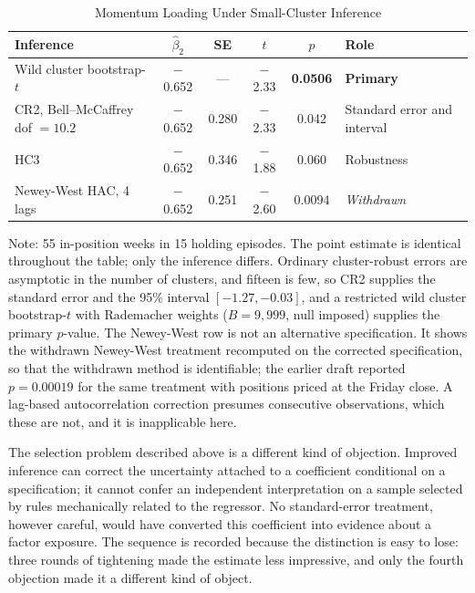 \documentclass[11pt]{article}
\begin{document}
\begin{table}[H]
\centering
\caption{Momentum Loading Under Small-Cluster Inference}
\label{tab:sevariants}
\small
\begin{tabular}{@{}lccccl@{}}
\toprule
Inference & $\hat{\beta}_2$ & SE & $t$ & $p$ & Role \\
\midrule
Wild cluster bootstrap-$t$ & $-$0.652 & --- & $-$2.33 & \textbf{0.0506} & \textbf{Primary} \\
CR2, Bell--McCaffrey dof $= 10.2$ & $-$0.652 & 0.280 & $-$2.33 & 0.042 & Standard error and interval \\
HC3 & $-$0.652 & 0.346 & $-$1.88 & 0.060 & Robustness \\
\midrule
Newey-West HAC, 4 lags & $-$0.652 & 0.251 & $-$2.60 & 0.0094 & \emph{Withdrawn} \\
\bottomrule
\end{tabular}
\par\vspace{0.3em}
\parbox{\linewidth}{\footnotesize Note: 55 in-position weeks in 15 holding episodes. The point estimate is identical throughout the table; only the inference differs. Ordinary cluster-robust errors are asymptotic in the number of clusters, and fifteen is few, so CR2 supplies the standard error and the 95\% interval $[-1.27, -0.03]$, and a restricted wild cluster bootstrap-$t$ with Rademacher weights ($B = 9{,}999$, null imposed) supplies the primary $p$-value. The Newey-West row is not an alternative specification. It shows the withdrawn Newey-West treatment recomputed on the corrected specification, so that the withdrawn method is identifiable; the earlier draft reported $p = 0.00019$ for the same treatment with positions priced at the Friday close. A lag-based autocorrelation correction presumes consecutive observations, which these are not, and it is inapplicable here.}
\end{table}


The selection problem described above is a different kind of objection. Improved inference can correct the uncertainty attached to a coefficient conditional on a specification; it cannot confer an independent interpretation on a sample selected by rules mechanically related to the regressor. No standard-error treatment, however careful, would have converted this coefficient into evidence about a factor exposure. The sequence is recorded because the distinction is easy to lose: three rounds of tightening made the estimate less impressive, and only the fourth objection made it a different kind of object.
\end{document}
